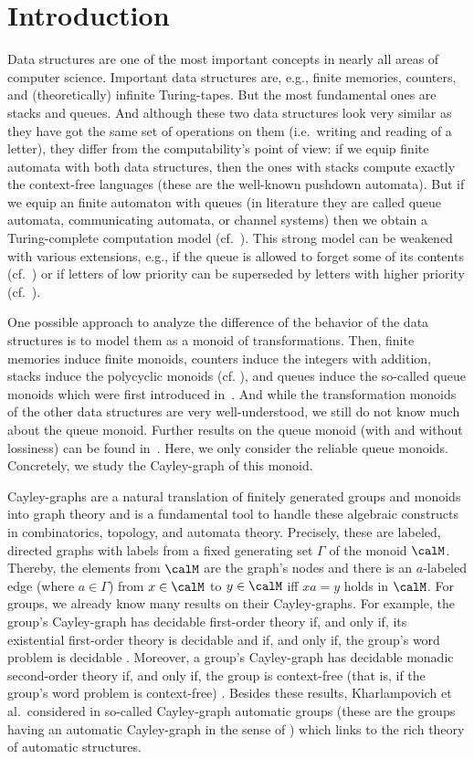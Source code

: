 \section{Introduction}
Data structures are one of the most important concepts in nearly all areas of computer science. Important data structures are, e.g., finite memories, counters, and (theoretically) infinite Turing-tapes. But the most fundamental ones are stacks and queues. And although these two data structures look very similar as they have got the same set of operations on them (i.e.\ writing and reading of a letter), they differ from the computability's point of view: if we equip finite automata with both data structures, then the ones with stacks compute exactly the context-free languages (these are the well-known pushdown automata). But if we equip an finite automaton with queues (in literature they are called queue automata, communicating automata, or channel systems) then we obtain a Turing-complete computation model (cf.~\cite{BraZ83,Bol06}). This strong model can be weakened with various extensions, e.g., if the queue is allowed to forget some of its contents (cf.~\cite{AbdJ96,CecFP96,MasS02}) or if letters of low priority can be superseded by letters with higher priority (cf.~\cite{HaaSS14}).

One possible approach to analyze the difference of the behavior of the data structures is to model them as a monoid of transformations. Then, finite memories induce finite monoids, counters induce the integers with addition, stacks induce the polycyclic monoids (cf. \cite{Sak86,kambites2009}), and queues induce the so-called queue monoids which were first introduced in~\cite{HusKZ17}. And while the transformation monoids of the other data structures are very well-understood, we still do not know much about the queue monoid. Further results on the queue monoid (with and without lossiness) can be found in~\cite{KKP18,Koe18}. Here, we only consider the reliable queue monoids. Concretely, we study the Cayley-graph of this monoid.

Cayley-graphs are a natural translation of finitely generated groups and monoids into graph theory and is a fundamental tool to handle these algebraic constructs in combinatorics, topology, and automata theory. Precisely, these are labeled, directed graphs with labels from a fixed generating set $\varGamma$ of the monoid $\calM$. Thereby, the elements from $\calM$ are the graph's nodes and there is an $a$-labeled edge (where $a\in\varGamma$) from $x\in\calM$ to $y\in\calM$ iff $xa=y$ holds in $\calM$. For groups, we already know many results on their Cayley-graphs. For example, the group's Cayley-graph has decidable first-order theory if, and only if, its existential first-order theory is decidable and if, and only if, the group's word problem is decidable \cite{KusL05}. Moreover, a group's Cayley-graph has decidable monadic second-order theory if, and only if, the group is context-free (that is, if the group's word problem is context-free) \cite{MulS85,KusL05}. Besides these results, Kharlampovich et al.\ considered in \cite{KKM14} so-called Cayley-graph automatic groups (these are the groups having an automatic Cayley-graph in the sense of \cite{KN95}) which links to the rich theory of automatic structures.

